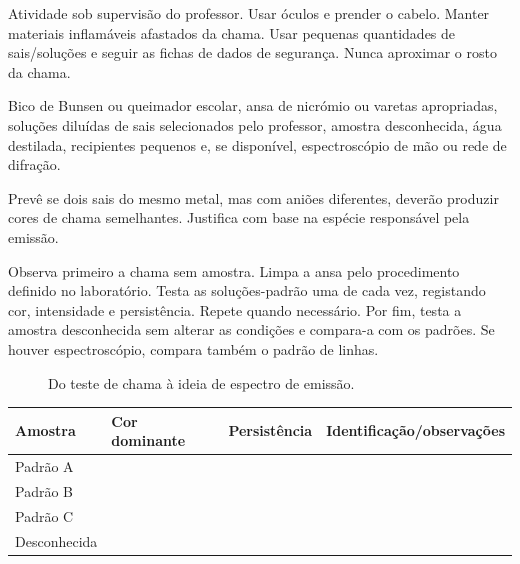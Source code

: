 \documentclass[11pt,a4paper,openany]{book}
\begin{document}
\begin{seguranca}
Atividade sob supervisão do professor. Usar óculos e prender o cabelo. Manter materiais inflamáveis afastados da chama. Usar pequenas quantidades de sais/soluções e seguir as fichas de dados de segurança. Nunca aproximar o rosto da chama.
\end{seguranca}

\begin{material}
Bico de Bunsen ou queimador escolar, ansa de nicrómio ou varetas apropriadas, soluções diluídas de sais selecionados pelo professor, amostra desconhecida, água destilada, recipientes pequenos e, se disponível, espectroscópio de mão ou rede de difração.
\end{material}

\begin{prelab}
Prevê se dois sais do mesmo metal, mas com aniões diferentes, deverão produzir cores de chama semelhantes. Justifica com base na espécie responsável pela emissão.
\end{prelab}

\begin{metodo}
Observa primeiro a chama sem amostra. Limpa a ansa pelo procedimento definido no laboratório. Testa as soluções-padrão uma de cada vez, registando cor, intensidade e persistência. Repete quando necessário. Por fim, testa a amostra desconhecida sem alterar as condições e compara-a com os padrões. Se houver espectroscópio, compara também o padrão de linhas.
\end{metodo}

\begin{figure}[H]
\centering
{}
\caption{Do teste de chama à ideia de espectro de emissão.}
\end{figure}

\begin{registo}
\begin{center}
\begin{tabular}{@{}llll@{}}
\toprule
Amostra & Cor dominante & Persistência & Identificação/observações\\
\midrule
Padrão A & & &\\
Padrão B & & &\\
Padrão C & & &\\
Desconhecida & & &\\
\bottomrule
\end{tabular}
\end{center}
\end{registo}
\end{document}
